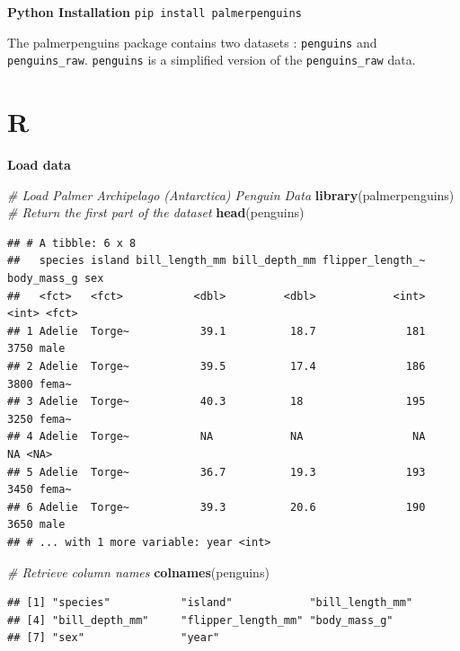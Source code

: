 \documentclass[]{book}
\newenvironment{Shaded}{\begin{snugshade}}{\end{snugshade}}
\newcommand{\CommentTok}[1]{\textcolor[rgb]{0.56,0.35,0.01}{\textit{#1}}}
\newcommand{\KeywordTok}[1]{\textcolor[rgb]{0.13,0.29,0.53}{\textbf{#1}}}
\newcommand{\NormalTok}[1]{#1}
\begin{document}
\textbf{Python Installation}
\texttt{pip\ install\ palmerpenguins}

The palmerpenguins package contains two datasets : \texttt{penguins} and \texttt{penguins\_raw}. \texttt{penguins} is a simplified version of the \texttt{penguins\_raw} data.

\hypertarget{r-5}{%
\section{R}\label{r-5}}

\textbf{Load data}

\begin{Shaded}
\begin{Highlighting}[]
\CommentTok{# Load Palmer Archipelago (Antarctica) Penguin Data}
\KeywordTok{library}\NormalTok{(palmerpenguins)}
\CommentTok{# Return the first part of the dataset}
\KeywordTok{head}\NormalTok{(penguins)}
\end{Highlighting}
\end{Shaded}

\begin{verbatim}
## # A tibble: 6 x 8
##   species island bill_length_mm bill_depth_mm flipper_length_~ body_mass_g sex  
##   <fct>   <fct>           <dbl>         <dbl>            <int>       <int> <fct>
## 1 Adelie  Torge~           39.1          18.7              181        3750 male 
## 2 Adelie  Torge~           39.5          17.4              186        3800 fema~
## 3 Adelie  Torge~           40.3          18                195        3250 fema~
## 4 Adelie  Torge~           NA            NA                 NA          NA <NA> 
## 5 Adelie  Torge~           36.7          19.3              193        3450 fema~
## 6 Adelie  Torge~           39.3          20.6              190        3650 male 
## # ... with 1 more variable: year <int>
\end{verbatim}

\begin{Shaded}
\begin{Highlighting}[]
\CommentTok{# Retrieve column names}
\KeywordTok{colnames}\NormalTok{(penguins)}
\end{Highlighting}
\end{Shaded}

\begin{verbatim}
## [1] "species"           "island"            "bill_length_mm"   
## [4] "bill_depth_mm"     "flipper_length_mm" "body_mass_g"      
## [7] "sex"               "year"
\end{verbatim}
\end{document}
